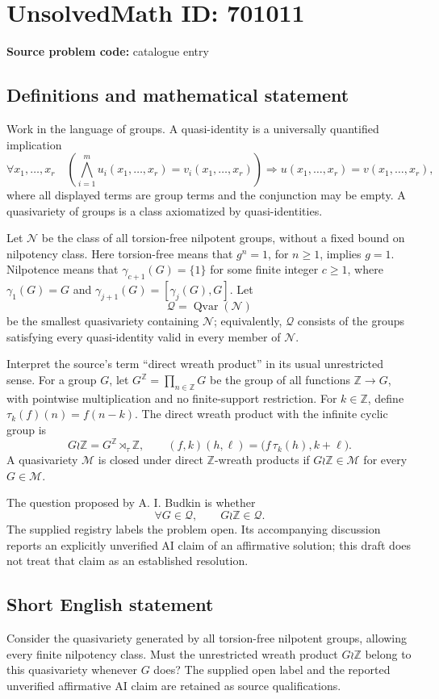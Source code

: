 \documentclass[11pt]{article}
\newcommand{\Z}{\mathbb{Z}}
\begin{document}
\section*{UnsolvedMath ID: 701011}
\textbf{Source problem code:} catalogue entry
\subsection{Definitions and mathematical statement}
Work in the language of groups. A quasi-identity is a universally quantified implication
\[
\forall x_1,\ldots,x_r\quad
\left(\bigwedge_{i=1}^{m}u_i(x_1,\ldots,x_r)=v_i(x_1,\ldots,x_r)\right)
\Longrightarrow u(x_1,\ldots,x_r)=v(x_1,\ldots,x_r),
\]
where all displayed terms are group terms and the conjunction may be empty. A quasivariety of groups is a class axiomatized by quasi-identities.

Let \(\mathcal N\) be the class of all torsion-free nilpotent groups, without a fixed bound on nilpotency class. Here torsion-free means that \(g^n=1\), for \(n\geq 1\), implies \(g=1\). Nilpotence means that \(\gamma_{c+1}(G)=\{1\}\) for some finite integer \(c\geq 1\), where \(\gamma_1(G)=G\) and \(\gamma_{j+1}(G)=[\gamma_j(G),G]\). Let
\[
\mathcal Q=\operatorname{Qvar}(\mathcal N)
\]
be the smallest quasivariety containing \(\mathcal N\); equivalently, \(\mathcal Q\) consists of the groups satisfying every quasi-identity valid in every member of \(\mathcal N\).

Interpret the source's term ``direct wreath product'' in its usual unrestricted sense. For a group \(G\), let \(G^{\Z}=\prod_{n\in\Z}G\) be the group of all functions \(\Z\to G\), with pointwise multiplication and no finite-support restriction. For \(k\in\Z\), define \(\tau_k(f)(n)=f(n-k)\). The direct wreath product with the infinite cyclic group is
\[
G\wr\Z=G^{\Z}\rtimes_{\tau}\Z,
\qquad
(f,k)(h,\ell)=\bigl(f\,\tau_k(h),k+\ell\bigr).
\]
A quasivariety \(\mathcal M\) is closed under direct \(\Z\)-wreath products if \(G\wr\Z\in\mathcal M\) for every \(G\in\mathcal M\).

The question proposed by A. I. Budkin is whether
\[
\forall G\in\mathcal Q,\qquad G\wr\Z\in\mathcal Q.
\]
The supplied registry labels the problem open. Its accompanying discussion reports an explicitly unverified AI claim of an affirmative solution; this draft does not treat that claim as an established resolution.
\subsection{Short English statement}
Consider the quasivariety generated by all torsion-free nilpotent groups, allowing every finite nilpotency class. Must the unrestricted wreath product \(G\wr\Z\) belong to this quasivariety whenever \(G\) does? The supplied open label and the reported unverified affirmative AI claim are retained as source qualifications.
\end{document}
